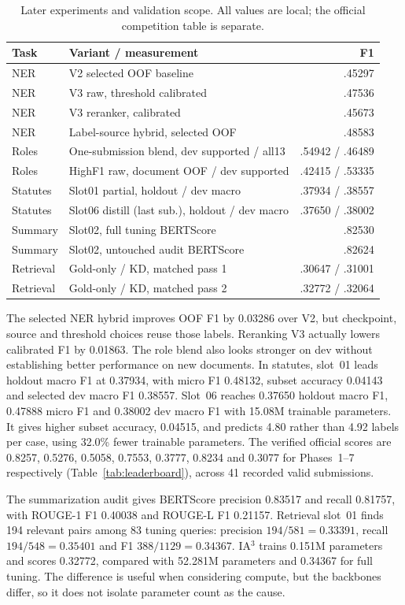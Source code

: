 \begin{table}[H]
\centering\small
\caption{Later experiments and validation scope. All values are local; the official competition table is separate.}
\label{tab:later}
\begin{tabularx}{\textwidth}{lXr}
\toprule
Task & Variant / measurement & F1\\
\midrule
NER & V2 selected OOF baseline & .45297\\
NER & V3 raw, threshold calibrated & .47536\\
NER & V3 reranker, calibrated & .45673\\
NER & Label-source hybrid, selected OOF & .48583\\
Roles & One-submission blend, dev supported / all13 & .54942 / .46489\\
Roles & HighF1 raw, document OOF / dev supported & .42415 / .53335\\
Statutes & Slot01 partial, holdout / dev macro & .37934 / .38557\\
Statutes & Slot06 distill (last sub.), holdout / dev macro & .37650 / .38002\\
Summary & Slot02, full tuning BERTScore & .82530\\
Summary & Slot02, untouched audit BERTScore & .82624\\
Retrieval & Gold-only / KD, matched pass 1 & .30647 / .31001\\
Retrieval & Gold-only / KD, matched pass 2 & .32772 / .32064\\
\bottomrule
\end{tabularx}
\end{table}

The selected NER hybrid improves OOF F1 by 0.03286 over V2, but checkpoint, source and threshold choices reuse those labels. Reranking V3 actually lowers calibrated F1 by 0.01863. The role blend also looks stronger on dev without establishing better performance on new documents. In statutes, slot~01 leads holdout macro F1 at 0.37934, with micro F1 0.48132, subset accuracy 0.04143 and selected dev macro F1 0.38557. Slot~06 reaches 0.37650 holdout macro F1, 0.47888 micro F1 and 0.38002 dev macro F1 with 15.08M trainable parameters. It gives higher subset accuracy, 0.04515, and predicts 4.80 rather than 4.92 labels per case, using 32.0\% fewer trainable parameters. The verified official scores are 0.8257, 0.5276, 0.5058, 0.7553, 0.3777, 0.8234 and 0.3077 for Phases~1--7 respectively (Table~\ref{tab:leaderboard}), across 41 recorded valid submissions.

The summarization audit gives BERTScore precision 0.83517 and recall 0.81757, with ROUGE-1 F1 0.40038 and ROUGE-L F1 0.21157. Retrieval slot~01 finds 194 relevant pairs among 83 tuning queries: precision $194/581=0.33391$, recall $194/548=0.35401$ and F1 $388/1129=0.34367$. IA$^3$ trains 0.151M parameters and scores 0.32772, compared with 52.281M parameters and 0.34367 for full tuning. The difference is useful when considering compute, but the backbones differ, so it does not isolate parameter count as the cause.
